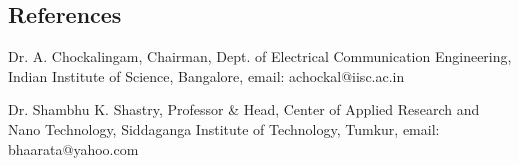 \documentclass[line]{resume}
\begin{document}
{\begin{resume}

    \section{\mysidestyle References}
    \begin{list2}
     \item Dr. A. Chockalingam, Chairman, Dept. of Electrical Communication Engineering, Indian Institute of Science, Bangalore, 
          email: achockal@iisc.ac.in

     \item Dr. Shambhu K. Shastry, Professor \& Head, Center of Applied Research and Nano Technology, Siddaganga Institute of Technology, Tumkur, 
           email: bhaarata@yahoo.com       
    
    \end{list2}



\end{resume}}
\end{document}
